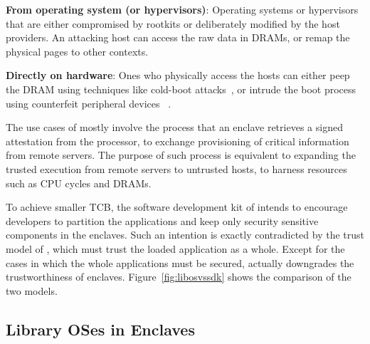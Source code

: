 \begin{compactitem}

\item {\bf From operating system (or hypervisors)}:
Operating systems or hypervisors
that are either compromised by rootkits
or deliberately modified by the host providers.
An attacking host can access the raw data in DRAMs, or remap the
physical pages to other contexts.

\item {\bf Directly on hardware}:
Ones who physically access the hosts can either peep
the DRAM using techniques like cold-boot attacks~\cite{halderman09coldboot},
or intrude the boot process using counterfeit peripheral devices
~\cite{hudson15thunderstrike}.

\end{compactitem}

The use cases of \sgx{} mostly involve the process that an enclave
retrieves a signed attestation from the processor,
to exchange provisioning of critical information from remote servers.
The purpose of such process is equivalent to
expanding the trusted execution
from remote servers
to untrusted hosts,
to harness resources such as CPU cycles and DRAMs.


To achieve smaller TCB, the software development kit of \sgx{}
intends to encourage developers to partition the applications and
keep only security sensitive components in the enclaves.
Such an intention is exactly contradicted by the trust model of \haven{},
which must trust the loaded application as a whole.
Except for the cases in which the whole applications must be secured,
\haven{} actually downgrades the trustworthiness of enclaves.
Figure~\ref{fig:libosvssdk} shows the comparison of the two models.

\subsection{Library OSes in \sgx{} Enclaves}
